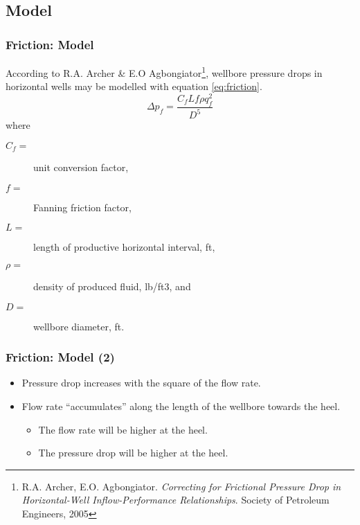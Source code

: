 \subsection{Model}
\begin{frame}
    \frametitle{Friction: Model}
    According to R.A. Archer \& E.O Agbongiator\footnote{R.A. Archer, E.O. Agbongiator. \emph{Correcting for Frictional Pressure Drop in Horizontal-Well Inflow-Performance Relationships}. Society of Petroleum Engineers, 2005}, wellbore pressure drops in horizontal wells may be modelled with equation \ref{eq:friction}.
    \begin{equation}
        \label{eq:friction}
        \Delta p_f = \frac{C_f L f \rho q_f^2}{D^5}
    \end{equation}
    where
    \begin{description}
        \item[$C_f=$] unit conversion factor, 
        \item[$f=$] Fanning friction factor,
        \item[$L=$] length of productive horizontal interval, ft,
        \item[$\rho=$] density of produced fluid, lb/ft3, and
        \item[$D=$] wellbore diameter, ft.
    \end{description}
\end{frame}



\begin{frame}
    \frametitle{Friction: Model (2)}
    \begin{itemize}
            \item Pressure drop increases with the square of the flow rate.
            \item Flow rate ``accumulates'' along the length of the wellbore towards the heel.
            \begin{itemize}
                \item The flow rate will be higher at the heel.
                \item The pressure drop will be higher at the heel.
            \end{itemize}
        \end{itemize}    
\end{frame}


